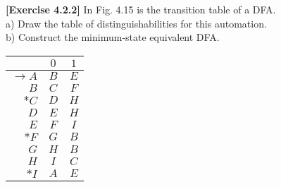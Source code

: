 \textbf{[Exercise 4.2.2]} In Fig. 4.15 is the transition table of a DFA.\\
a) Draw the table of distinguishabilities for this automation.\\
b) Construct the minimum-state equivalent DFA.
\begin{center}
    \begin{tabular}{r||c|c}
                            & $0$          & $1$   \\ \hline \hline
        $\rightarrow A$     & $B$          & $E$   \\
        $B$                 & $C$          & $F$   \\
        $*C$                & $D$          & $H$   \\
        $D$                 & $E$          & $H$    \\
        $E$                 & $F$          & $I$   \\
        $*F$                & $G$          & $B$   \\
        $G$                 & $H$          & $B$   \\
        $H$                 & $I$          & $C$   \\
        $*I$                & $A$          & $E$   
    \end{tabular}
\end{center}